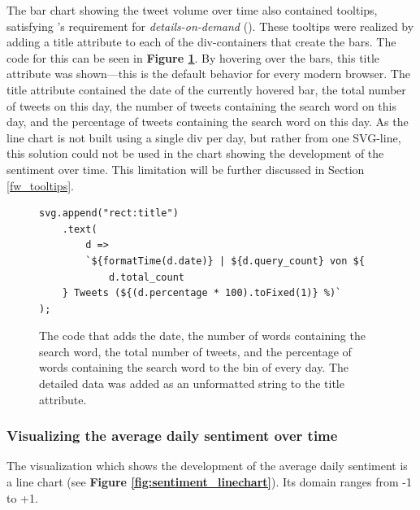 The bar chart showing the tweet volume over time also contained tooltips, satisfying \citeauthor{shneidermanEyesHaveIt1996}'s requirement for \emph{details-on-demand} (\cite{shneidermanEyesHaveIt1996}). These tooltips were realized by adding a title attribute to each of the div-containers that create the bars. The code for this can be seen in \textbf{Figure \ref{code:details_title}}. By hovering over the bars, this title attribute was shown---this is the default behavior for every modern browser. The title attribute contained the date of the currently hovered bar, the total number of tweets on this day, the number of tweets containing the search word on this day, and the percentage of tweets containing the search word on this day. As the line chart is not built using a single div per day, but rather from one SVG-line, this solution could not be used in the chart showing the development of the sentiment over time. This limitation will be further discussed in Section \ref{fw_tooltips}.

\begin{figure}[h!]
    \begin{verbatim}
svg.append("rect:title")
    .text(
        d =>
        `${formatTime(d.date)} | ${d.query_count} von ${
            d.total_count
    } Tweets (${(d.percentage * 100).toFixed(1)} %)`
);
    \end{verbatim}
    \caption{The code that adds the date, the number of words containing the search word, the total number of tweets, and the percentage of words containing the search word to the bin of every day. The detailed data was added as an unformatted string to the title attribute.}
    \label{code:details_title}
\end{figure}

\subsubsection{Visualizing the average daily sentiment over time}
The visualization which shows the development of the average daily sentiment is a line chart (see \textbf{Figure \ref{fig:sentiment_linechart}}). Its domain ranges from -1 to +1.

